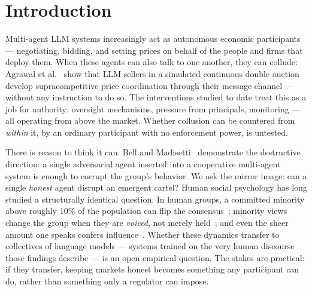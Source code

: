 \documentclass[acmsmall]{acmart}
\begin{document}


\maketitle

\section{Introduction}

Multi-agent LLM systems increasingly act as autonomous economic
participants --- negotiating, bidding, and setting prices on behalf of the
people and firms that deploy them. When these agents can also talk to one
another, they can collude: Agrawal et al.~\cite{agrawal2025collusion} show
that LLM sellers in a simulated continuous double auction develop
supracompetitive price coordination through their message channel ---
without any instruction to do so. The interventions studied to date treat
this as a job for authority: oversight mechanisms, pressure from
principals, monitoring --- all operating from above the market. Whether
collusion can be countered from \emph{within} it, by an ordinary
participant with no enforcement power, is untested.

There is reason to think it can. Bell and
Madisetti~\cite{bell2026corruption} demonstrate the destructive direction:
a single adversarial agent inserted into a cooperative multi-agent system
is enough to corrupt the group's behavior. We ask the mirror image: can a
single \emph{honest} agent disrupt an emergent cartel? Human social
psychology has long studied a structurally identical question. In human
groups, a committed minority above roughly 10\% of the population can flip
the consensus~\cite{xie2011social}; minority views change the group when
they are \emph{voiced}, not merely held~\cite{maier1952contribution}; and
even the sheer amount one speaks confers influence~\cite{jones2007babble}.
Whether these dynamics transfer to collectives of language models ---
systems trained on the very human discourse those findings describe --- is
an open empirical question. The stakes are practical: if they transfer,
keeping markets honest becomes something any participant can do, rather
than something only a regulator can impose.
\end{document}

